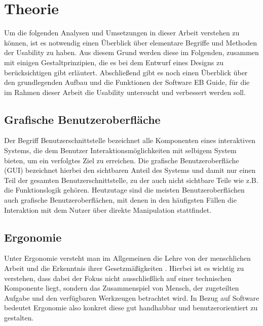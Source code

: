 \chapter{Theorie}\label{ch:data}
Um die folgenden Analysen und Umsetzungen in dieser Arbeit verstehen zu können, ist es notwendig einen Überblick über elementare Begriffe und Methoden der Usability zu haben.
Aus diesem Grund werden diese im Folgenden, zusammen mit einigen Gestaltprinzipien, die es bei dem Entwurf eines Designs zu berücksichtigen gibt erläutert.
Abschließend gibt es noch einen Überblick über den grundlegenden Aufbau und die Funktionen der Software EB Guide, für die im Rahmen dieser Arbeit die Usability untersucht und verbessert werden soll.

\section{Grafische Benutzeroberfläche}
Der Begriff Benutzerschnittstelle bezeichnet alle Komponenten eines interaktiven Systems, die dem Benutzer Interaktionsmöglichkeiten mit selbigem System bieten, um ein verfolgtes Ziel zu erreichen.
Die grafische Benutzeroberfläche (GUI) bezeichnet hierbei den sichtbaren Anteil des Systems und damit nur einen Teil der gesamten Benutzerschnittstelle, zu der auch nicht sichtbare Teile wie z.B. die Funktionslogik gehören\cite{Sarodnick.2016}.
Heutzutage sind die meisten Benutzeroberflächen auch grafische Benutzeroberflächen, mit denen in den häufigsten Fällen die Interaktion mit dem Nutzer über direkte Manipulation stattfindet\cite{Nielsen.1995?}.

\section{Ergonomie}
Unter Ergonomie versteht man im Allgemeinen die \glqq Lehre von der menschlichen Arbeit und die Erkenntnis ihrer Gesetzmäßigkeiten\grqq{} \cite{https:www.facebook.comArbeitsplatzergonomie.2014}.
Hierbei ist es wichtig zu verstehen, dass dabei der Fokus nicht ausschließlich auf einer technischen Komponente liegt, sondern das Zusammenspiel von Mensch, der zugeteilten Aufgabe und den verfügbaren Werkzeugen betrachtet wird\cite{Sarodnick.2016}.
In Bezug auf Software bedeutet Ergonomie also konkret diese gut handhabbar und benutzerorientiert zu gestalten.

